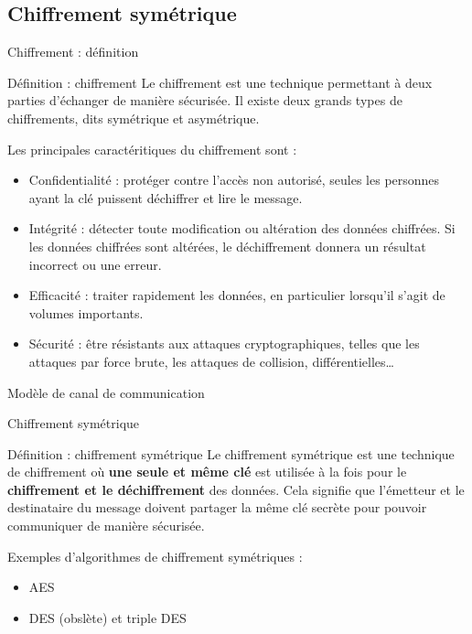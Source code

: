 \subsection{Chiffrement symétrique}

\begin{frame}{Chiffrement : définition}
  \begin{block}{Définition : chiffrement}
    Le chiffrement est une technique permettant à deux parties d'échanger de manière sécurisée.
    Il existe deux grands types de chiffrements, dits symétrique et asymétrique.

    Les principales caractéritiques du chiffrement sont :

    \begin{itemize}
      \item Confidentialité : protéger contre l'accès non autorisé, seules les personnes ayant la clé puissent déchiffrer et lire le message.
      \item Intégrité : détecter toute modification ou altération des données chiffrées. Si les données chiffrées sont altérées, le déchiffrement donnera un résultat incorrect ou une erreur.
      \item Efficacité : traiter rapidement les données, en particulier lorsqu'il s'agit de volumes importants.
      \item Sécurité : être résistants aux attaques cryptographiques, telles que les attaques par force brute, les attaques de collision, différentielles\dots
    \end{itemize}
  \end{block}
\end{frame}

\begin{frame}{Modèle de canal de communication}
  
\end{frame}

\begin{frame}{Chiffrement symétrique}
  \begin{block}{Définition : chiffrement symétrique}
    Le chiffrement symétrique est une technique de chiffrement où \textbf{une seule et même clé} est utilisée à la fois pour le \textbf{chiffrement et le déchiffrement} des données.
    Cela signifie que l'émetteur et le destinataire du message doivent partager la même clé secrète pour pouvoir communiquer de manière sécurisée.

    \vspace{1em}

    Exemples d'algorithmes de chiffrement symétriques :

    \begin{itemize}
      \item AES
      \item DES (obslète) et triple DES
    \end{itemize}
  \end{block}
\end{frame}

